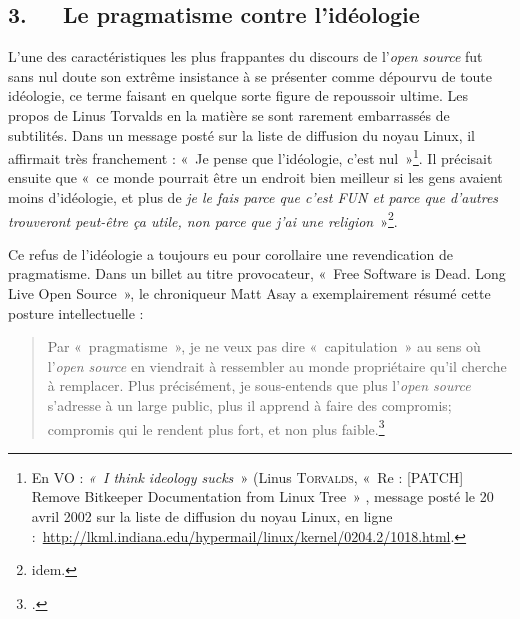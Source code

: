 \documentclass{FramateX}
\begin{document}
\begin{refsection}
\section*{3.~~~Le pragmatisme contre l'idéologie}
{}

L'une des caractéristiques les plus frappantes du discours de
l'\textit{open source} fut sans nul doute son extrême insistance à se
présenter comme dépourvu de toute idéologie, ce terme faisant en
quelque sorte figure de repoussoir ultime. Les propos de Linus Torvalds
en la matière se sont rarement embarrassés de subtilités. Dans un
message posté sur la liste de diffusion du noyau Linux, il
affirmait très franchement : «~Je pense que l'idéologie, c'est
nul~»\footnote{En VO : \textit{«~I think ideology sucks~}» (Linus
\textsc{Torvalds}, «~Re : [PATCH] Remove Bitkeeper Documentation from Linux Tree~» , message posté le 20 avril 2002 sur la liste de
diffusion du noyau Linux, en ligne :\ \url{http://lkml.indiana.edu/hypermail/linux/kernel/0204.2/1018.html}.}. Il
précisait ensuite que «~ce monde pourrait être un endroit bien meilleur
si les gens avaient moins d'idéologie, et plus de \textit{je le fais
parce que c'est FUN et parce que d'autres trouveront peut-être ça
utile, non parce que j'ai une religion}~»\footnote{idem.}.

Ce refus de l'idéologie a toujours eu pour corollaire une revendication
de pragmatisme. Dans un billet au titre provocateur, «~Free
Software is Dead. Long Live Open Source~», le chroniqueur Matt Asay a
exemplairement résumé cette posture intellectuelle : 

\begin{quote}
Par «~pragmatisme~», je ne veux pas dire «~capitulation~» au
sens où l'\textit{open source} en viendrait à ressembler au monde
propriétaire qu'il cherche à remplacer. Plus précisément, je
sous-entends que plus l'\textit{open source} s'adresse à un large
public, plus il apprend à faire des compromis; compromis qui le
rendent plus fort, et non plus faible.\footnote{\cite{asayfree2009}.}
\end{quote}


\end{refsection}
\end{document}
